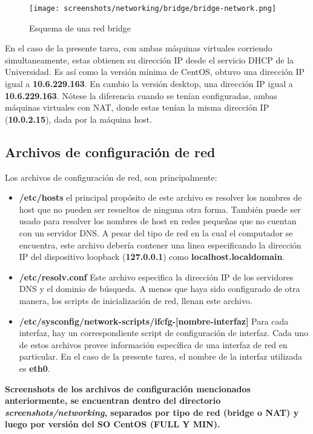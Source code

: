 \documentclass[11pt]{article}
\begin{document}
	\begin{figure}[ht]
	\center
	\texttt{[image: screenshots/networking/bridge/bridge-network.png]} 
	\caption{Esquema de una red bridge} 
	\end{figure}

En el caso de la presente tarea, con ambas máquinas virtuales corriendo simultaneamente, estas obtienen su dirección IP desde el servicio DHCP de la Universidad. Es así como la versión mínima de CentOS, obtuvo una dirección IP igual a \textbf{10.6.229.163}. En cambio la versión desktop, una dirección IP igual a \textbf{10.6.229.163}. Nótese la diferencia cuando se tenían configuradas, ambas máquinas virtuales con NAT, donde estas tenían la misma dirección IP (\textbf{10.0.2.15}), dada por la máquina host.

\subsection{Archivos de configuración de red}
Los archivos de configuración de red, son principalmente:
\begin{itemize}
	\item \textbf{/etc/hosts} el principal propósito de este archivo es resolver los nombres de host que no pueden ser resueltos de ninguna otra forma. También puede ser usado para resolver los nombres de host en redes pequeñas que no cuentan con un servidor DNS. A pesar del tipo de red en la cual el computador se encuentra, este archivo debería contener una linea especificando la dirección IP del dispositivo loopback (\textbf{127.0.0.1}) como \textbf{localhost.localdomain}.

	\item \textbf{/etc/resolv.conf} Este archivo especifica la dirección IP de los servidores DNS y el dominio de búsqueda. A menos que haya sido configurado de otra manera, los scripts de inicialización de red, llenan este archivo. 

	\item \textbf{/etc/sysconfig/network-scripts/ifcfg-[nombre-interfaz]} Para cada interfaz, hay un correspondiente script de configuración de interfaz. Cada uno de estos archivos provee información específica de una interfaz de red en particular. En el caso de la presente tarea, el nombre de la interfaz utilizada es \textbf{eth0}.
\end{itemize}

\textbf{Screenshots de los archivos de configuración mencionados anteriormente, se encuentran dentro del directorio \textit{screenshots/networking}, separados por tipo de red (bridge o NAT) y luego por versión del SO CentOS (FULL Y MIN).}
\end{document}
